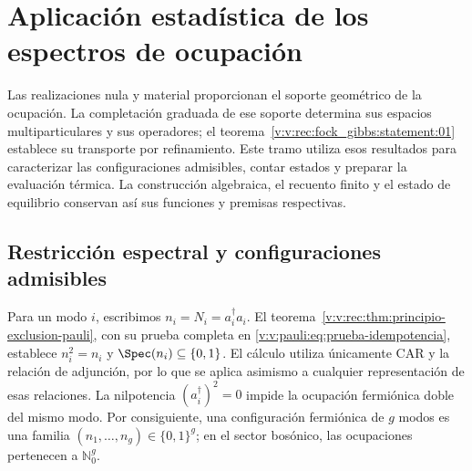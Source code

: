 \section{Aplicación estadística de los espectros de ocupación}
\label{v:v:rec:chap:ocupacion-estadistica}

Las realizaciones nula y material proporcionan el soporte geométrico de la
ocupación. La completación graduada de ese soporte determina sus espacios
multiparticulares y sus operadores; el
teorema~\ref{v:v:rec:fock_gibbs:statement:01} establece su transporte por
refinamiento. Este tramo utiliza esos resultados para caracterizar las
configuraciones admisibles, contar estados y preparar la evaluación térmica.
La construcción algebraica, el recuento finito y el estado de equilibrio
conservan así sus funciones y premisas respectivas.

\subsection{Restricción espectral y configuraciones admisibles}
\label{v:v:rec:pauli:section:02}

Para un modo \(i\), escribimos \(n_i=N_i=a_i^\dagger a_i\). El
teorema~\ref{v:v:rec:thm:principio-exclusion-pauli}, con su prueba completa en
\eqref{v:v:pauli:eq:prueba-idempotencia}, establece
\(n_i^2=n_i\) y \(\Spec(n_i)\subseteq\{0,1\}\). El cálculo utiliza
únicamente CAR y la relación de adjunción, por lo que se aplica asimismo
a cualquier representación de esas relaciones. La nilpotencia
\((a_i^\dagger)^2=0\) impide la ocupación fermiónica doble del mismo modo.
Por consiguiente, una configuración fermiónica de \(g\) modos es una
familia \((n_1,\ldots,n_g)\in\{0,1\}^g\); en el sector bosónico, las
ocupaciones pertenecen a \(\mathbb N_0^g\).


